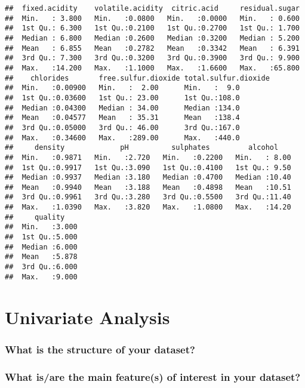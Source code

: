 \documentclass[]{article}
\begin{document}
\begin{verbatim}
##  fixed.acidity    volatile.acidity  citric.acid     residual.sugar  
##  Min.   : 3.800   Min.   :0.0800   Min.   :0.0000   Min.   : 0.600  
##  1st Qu.: 6.300   1st Qu.:0.2100   1st Qu.:0.2700   1st Qu.: 1.700  
##  Median : 6.800   Median :0.2600   Median :0.3200   Median : 5.200  
##  Mean   : 6.855   Mean   :0.2782   Mean   :0.3342   Mean   : 6.391  
##  3rd Qu.: 7.300   3rd Qu.:0.3200   3rd Qu.:0.3900   3rd Qu.: 9.900  
##  Max.   :14.200   Max.   :1.1000   Max.   :1.6600   Max.   :65.800  
##    chlorides       free.sulfur.dioxide total.sulfur.dioxide
##  Min.   :0.00900   Min.   :  2.00      Min.   :  9.0       
##  1st Qu.:0.03600   1st Qu.: 23.00      1st Qu.:108.0       
##  Median :0.04300   Median : 34.00      Median :134.0       
##  Mean   :0.04577   Mean   : 35.31      Mean   :138.4       
##  3rd Qu.:0.05000   3rd Qu.: 46.00      3rd Qu.:167.0       
##  Max.   :0.34600   Max.   :289.00      Max.   :440.0       
##     density             pH          sulphates         alcohol     
##  Min.   :0.9871   Min.   :2.720   Min.   :0.2200   Min.   : 8.00  
##  1st Qu.:0.9917   1st Qu.:3.090   1st Qu.:0.4100   1st Qu.: 9.50  
##  Median :0.9937   Median :3.180   Median :0.4700   Median :10.40  
##  Mean   :0.9940   Mean   :3.188   Mean   :0.4898   Mean   :10.51  
##  3rd Qu.:0.9961   3rd Qu.:3.280   3rd Qu.:0.5500   3rd Qu.:11.40  
##  Max.   :1.0390   Max.   :3.820   Max.   :1.0800   Max.   :14.20  
##     quality     
##  Min.   :3.000  
##  1st Qu.:5.000  
##  Median :6.000  
##  Mean   :5.878  
##  3rd Qu.:6.000  
##  Max.   :9.000
\end{verbatim}

\section{Univariate Analysis}\label{univariate-analysis}

\subsubsection{What is the structure of your
dataset?}\label{what-is-the-structure-of-your-dataset}

\subsubsection{What is/are the main feature(s) of interest in your
dataset?}\label{what-isare-the-main-features-of-interest-in-your-dataset}
\end{document}
